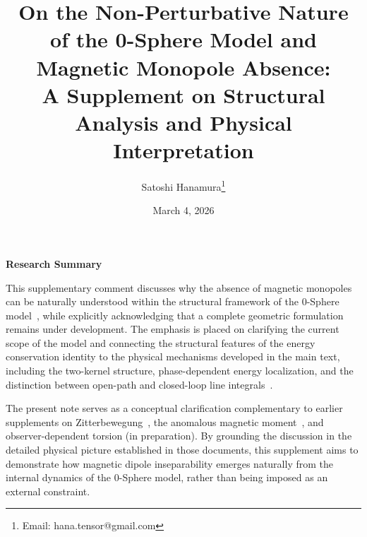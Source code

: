 \documentclass[12pt,letterpaper]{article}
\begin{document}
\title{On the Non-Perturbative Nature \\of the 0-Sphere Model and Magnetic Monopole Absence:\\
\normalsize A Supplement on Structural Analysis and Physical Interpretation}

\author{Satoshi Hanamura\thanks{Email: hana.tensor@gmail.com}}
\date{March 4, 2026}

\maketitle

\tableofcontents

\begin{center}
\textbf{Research Summary}
\end{center}

\justifying
This supplementary comment discusses why the absence of magnetic monopoles can be naturally understood within the structural framework of the 0-Sphere model~\cite{hanamura16759284,hanamura18603340}, while explicitly acknowledging that a complete geometric formulation remains under development. The emphasis is placed on clarifying the current scope of the model and connecting the structural features of the energy conservation identity to the physical mechanisms developed in the main text, including the two-kernel structure, phase-dependent energy localization, and the distinction between open-path and closed-loop line integrals~\cite{hanamura18203433}.

The present note serves as a conceptual clarification complementary to earlier supplements on Zitterbewegung~\cite{hanamura18356895}, the anomalous magnetic moment~\cite{hanamura18511664}, and observer-dependent torsion (in preparation). By grounding the discussion in the detailed physical picture established in those documents, this supplement aims to demonstrate how magnetic dipole inseparability emerges naturally from the internal dynamics of the 0-Sphere model, rather than being imposed as an external constraint.

\clearpage

\end{document}
